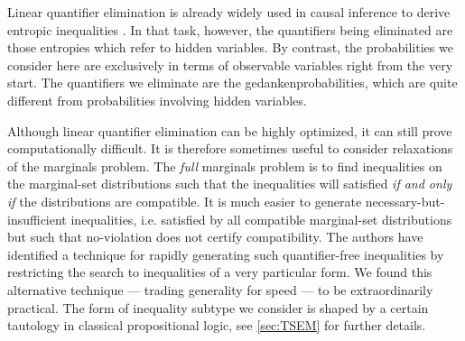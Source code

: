 Linear quantifier elimination is already widely used in causal inference to derive entropic inequalities \cite{fritz2013marginal,chaves2014novel,chaves2014informationinference}. In that task, however, the quantifiers being eliminated are those entropies which refer to hidden variables. By contrast, the probabilities we consider here are exclusively in terms of observable variables right from the very start. The quantifiers we eliminate are the gedankenprobabilities, which are quite different from probabilities involving hidden variables.

Although linear quantifier elimination can be highly optimized, it can still prove computationally difficult. It is therefore sometimes useful to consider relaxations of the marginals problem. The \emph{full} marginals problem is to find inequalities on the marginal-set distributions such that the inequalities will satisfied \emph{if and only if} the distributions are compatible. It is much easier to generate necessary-but-insufficient inequalities, i.e. satisfied by all compatible marginal-set distributions but such that no-violation does not certify compatibility. The authors have identified a technique for rapidly generating such quantifier-free inequalities by restricting the search to inequalities of a very particular form. We found this alternative technique — trading generality for speed — to be extraordinarily practical. The form of inequality subtype we consider is shaped by a certain tautology in classical propositional logic, see \cref{sec:TSEM} for further details.






